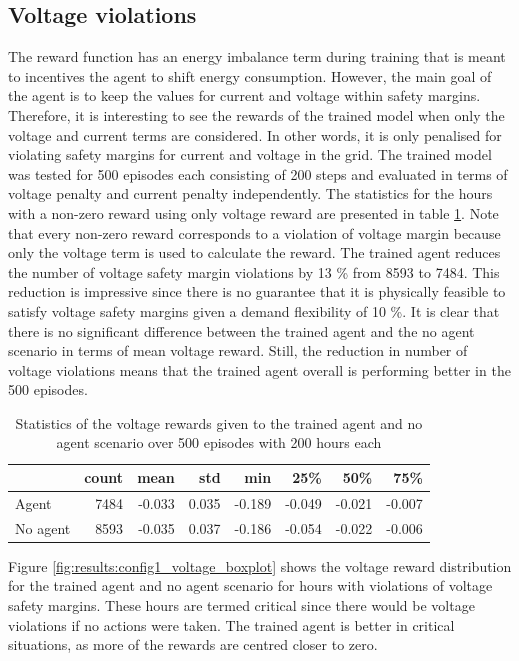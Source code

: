 \documentclass[class=book, crop=false]{standalone}
\begin{document}
\subsection{Voltage violations}
The reward function has an energy imbalance term during training that is meant to incentives the agent to shift energy consumption. However, the main goal of the agent is to keep the values for current and voltage within safety margins. Therefore, it is interesting to see the rewards of the trained model when only the voltage and current terms are considered. In other words, it is only penalised for violating safety margins for current and voltage in the grid. The trained model was tested for 500 episodes each consisting of 200 steps and evaluated
in terms of voltage penalty and current penalty independently. The statistics for the hours with a non-zero reward using only voltage reward are presented in table \ref{table:results:configuration1_reward_500_episodes}. Note that every non-zero reward corresponds to a violation of voltage margin because only the voltage term is used to calculate the reward. The trained agent reduces the number of voltage safety margin violations by 13 \% from 8593 to 7484. This reduction is impressive since there is no guarantee that it is physically feasible to satisfy voltage safety margins given a demand flexibility of 10 \%. It is clear that there is no significant difference between the trained agent and the no agent scenario in terms of mean voltage reward. Still, the reduction in number of voltage violations means that the trained agent overall is performing better in the 500 episodes. 
\begin{table}[h]
\center
\begin{tabular}{l|rrrrrrr}
         & count & mean   & std   & min    & 25\%   & 50\%   & 75\%   \\
\hline
Agent    & 7484  & -0.033 & 0.035 & -0.189 & -0.049 & -0.021 & -0.007 \\
No agent & 8593  & -0.035 & 0.037 & -0.186 & -0.054 & -0.022 & -0.006 \\
\hline
\end{tabular}
\caption{Statistics of the voltage rewards given to the trained agent and no agent scenario over 500 episodes with 200 hours each}
\label{table:results:configuration1_reward_500_episodes}
\end{table}

Figure \ref{fig:results:config1_voltage_boxplot} shows the voltage reward distribution for the trained agent and no agent scenario for hours with violations of voltage safety margins. These hours are termed critical since there would be voltage violations if no actions were taken. The trained agent is better in critical situations, as more of the rewards are centred closer to zero.
\end{document}
